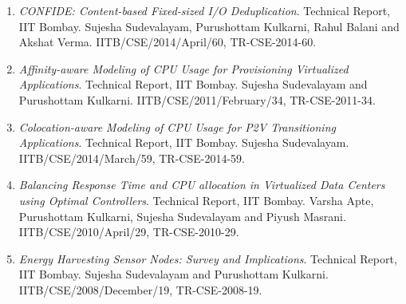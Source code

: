 \begin{enumerate}
\item \textit{CONFIDE: Content-based Fixed-sized I/O Deduplication}. Technical Report, IIT Bombay. Sujesha Sudevalayam, Purushottam Kulkarni, Rahul Balani and Akshat Verma. IITB/CSE/2014/April/60, TR-CSE-2014-60.
\item \textit{Affinity-aware Modeling of CPU Usage for Provisioning Virtualized Applications}. Technical Report, IIT Bombay. Sujesha Sudevalayam and Purushottam Kulkarni. IITB/CSE/2011/February/34, TR-CSE-2011-34.
\item \textit{Colocation-aware Modeling of CPU Usage for P2V Transitioning Applications}. Technical Report, IIT Bombay. Sujesha Sudevalayam. IITB/CSE/2014/March/59, TR-CSE-2014-59.
\item \textit{Balancing Response Time and CPU allocation in Virtualized Data Centers using Optimal Controllers}. Technical Report, IIT Bombay. Varsha Apte, Purushottam Kulkarni, Sujesha Sudevalayam and Piyush Masrani. IITB/CSE/2010/April/29, TR-CSE-2010-29.
\item \textit{Energy Harvesting Sensor Nodes: Survey and Implications}. Technical Report, IIT Bombay. Sujesha Sudevalayam and Purushottam Kulkarni. IITB/CSE/2008/December/19, TR-CSE-2008-19.
\end{enumerate}

